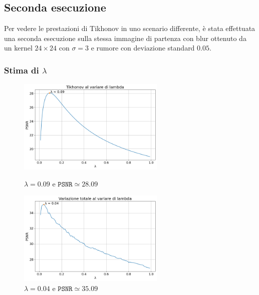 \documentclass[11pt]{article}
\begin{document}
\subsection{Seconda esecuzione}
Per vedere le prestazioni di Tikhonov in uno scenario differente, è stata effettuata una seconda esecuzione sulla stessa immagine di partenza con blur ottenuto da un kernel $24 \times 24$ con $\sigma=3$ e rumore con deviazione standard $0.05$.

\subsubsection{Stima di $\lambda$}
\begin{figure}[H]
    \centering
    \begin{minipage}{0.45\textwidth}
        \centering
        \includegraphics[width=7cm]{esecuzione/2/tikhonov_lambda.png}
        \caption{$\lambda=0.09$ e $\texttt{PSNR} \simeq 28.09$}
        \label{fig:tikhonov_lambda2}
    \end{minipage}\hfill
    \begin{minipage}{0.45\textwidth}
        \centering
        \includegraphics[width=7cm]{esecuzione/2/tv_lambda.png}
        \caption{$\lambda=0.04$ e $\texttt{PSNR} \simeq 35.09$}
        \label{fig:tv_lambda2}
    \end{minipage}
\end{figure}
\end{document}
